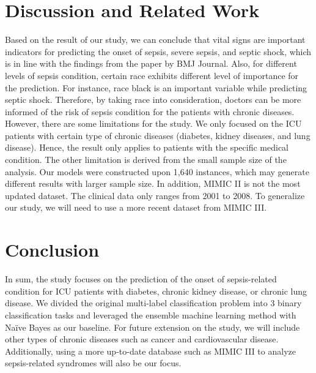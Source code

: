 \documentclass[twoside,11pt]{article}
\begin{document}
\section{Discussion and Related Work} 
Based on the result of our study, we can conclude that vital signs are important indicators for predicting the onset of sepsis, severe sepsis, and septic shock, which is in line with the findings from the paper by BMJ Journal\cite{cite6}. Also, for different levels of sepsis condition, certain race exhibits different level of importance for the prediction. For instance, race black is an important variable while predicting septic shock. Therefore, by taking race into consideration, doctors can be more informed of the risk of sepsis condition for the patients with chronic diseases. However, there are some limitations for the study. We only focused on the ICU patients with certain type of chronic diseases (diabetes, kidney diseases, and lung disease). Hence, the result only applies to patients with the specific medical condition. The other limitation is derived from the small sample size of the analysis. Our models were constructed upon 1,640 instances, which may generate different results with larger sample size. In addition, MIMIC II is not the most updated dataset. The clinical data only ranges from 2001 to 2008. To generalize our study, we will need to use a more recent dataset from MIMIC III.
\section{Conclusion} 
In sum, the study focuses on the prediction of the onset of sepsis-related condition for ICU patients with diabetes, chronic kidney disease, or chronic lung disease. We divided the original multi-label classification problem into 3 binary classification tasks and leveraged the ensemble machine learning method with Naïve Bayes as our baseline. For future extension on the study, we will include other types of chronic diseases such as cancer and cardiovascular disease. Additionally, using a more up-to-date database such as MIMIC III to analyze sepsis-related syndromes will also be our focus.



\appendix
\end{document}
